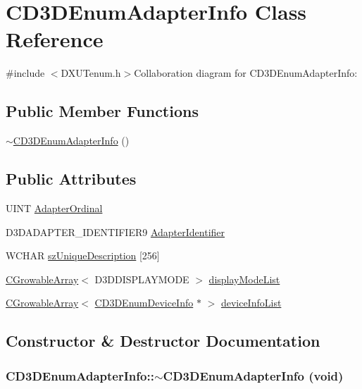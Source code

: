 \hypertarget{class_c_d3_d_enum_adapter_info}{
\section{CD3DEnumAdapterInfo Class Reference}
\label{class_c_d3_d_enum_adapter_info}
}


{\ttfamily \#include $<$DXUTenum.h$>$}Collaboration diagram for CD3DEnumAdapterInfo:\subsection*{Public Member Functions}
\begin{DoxyCompactItemize}
\item 
\hyperlink{class_c_d3_d_enum_adapter_info_a30fa3c2f7308635f979d923ad482a75c}{$\sim$CD3DEnumAdapterInfo} ()
\end{DoxyCompactItemize}
\subsection*{Public Attributes}
\begin{DoxyCompactItemize}
\item 
UINT \hyperlink{class_c_d3_d_enum_adapter_info_abf8c095138a96f052a283cf641d093d0}{AdapterOrdinal}
\item 
D3DADAPTER\_\-IDENTIFIER9 \hyperlink{class_c_d3_d_enum_adapter_info_a1d603b4cc9e0a298090a1fecfa1084a2}{AdapterIdentifier}
\item 
WCHAR \hyperlink{class_c_d3_d_enum_adapter_info_acd2d97d434ad9fcd3401b17eaccb90d5}{szUniqueDescription} \mbox{[}256\mbox{]}
\item 
\hyperlink{class_c_growable_array}{CGrowableArray}$<$ D3DDISPLAYMODE $>$ \hyperlink{class_c_d3_d_enum_adapter_info_ac5d98f229e64a218e04a6d69cf81c925}{displayModeList}
\item 
\hyperlink{class_c_growable_array}{CGrowableArray}$<$ \hyperlink{class_c_d3_d_enum_device_info}{CD3DEnumDeviceInfo} $\ast$ $>$ \hyperlink{class_c_d3_d_enum_adapter_info_adb1f596b3deed9388644ea7480d1c2ad}{deviceInfoList}
\end{DoxyCompactItemize}


\subsection{Constructor \& Destructor Documentation}
\hypertarget{class_c_d3_d_enum_adapter_info_a30fa3c2f7308635f979d923ad482a75c}{
\subsubsection[{$\sim$CD3DEnumAdapterInfo}]{\setlength{\rightskip}{0pt plus 5cm}CD3DEnumAdapterInfo::$\sim$CD3DEnumAdapterInfo (void)}}
\label{class_c_d3_d_enum_adapter_info_a30fa3c2f7308635f979d923ad482a75c}


